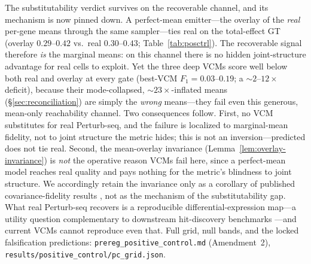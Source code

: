 \documentclass{article}
\theoremstyle{plain}
\theoremstyle{definition}
\theoremstyle{remark}
\begin{document}
The substitutability verdict survives on the recoverable channel, and its mechanism is now pinned down. A perfect-mean emitter---the overlay of the \emph{real} per-gene means through the same sampler---ties real on the total-effect GT (overlay $0.29$--$0.42$ vs.\ real $0.30$--$0.43$; Table~\ref{tab:posctrl}). The recoverable signal therefore \emph{is} the marginal means: on this channel there is no hidden joint-structure advantage for real cells to exploit. Yet the three deep VCMs score well below both real and overlay at every gate (best-VCM $F_1 = 0.03$--$0.19$; a $\sim\!2$--$12\times$ deficit), because their mode-collapsed, $\sim\!23\times$-inflated means (\S\ref{sec:reconciliation}) are simply the \emph{wrong} means---they fail even this generous, mean-only reachability channel. Two consequences follow. First, no VCM substitutes for real Perturb-seq, and the failure is localized to marginal-mean fidelity, not to joint structure the metric hides; this is not an inversion---predicted does not tie real. Second, the mean-overlay invariance (Lemma~\ref{lem:overlay-invariance}) is \emph{not} the operative reason VCMs fail here, since a perfect-mean model reaches real quality and pays nothing for the metric's blindness to joint structure. We accordingly retain the invariance only as a corollary of published covariance-fidelity results \citep{riasat2026marginals,rubbi2026ggeval}, not as the mechanism of the substitutability gap. What real Perturb-seq recovers is a reproducible differential-expression map---a utility question complementary to downstream hit-discovery benchmarks \citep{bereket2026perturbhd}---and current VCMs cannot reproduce even that. Full grid, null bands, and the locked falsification predictions: \texttt{prereg\_positive\_control.md} (Amendment~2), \texttt{results/positive\_control/pc\_grid.json}.
\end{document}
